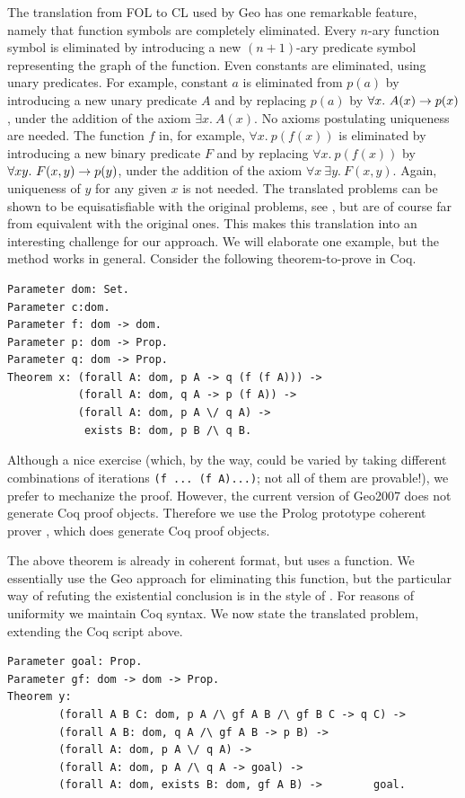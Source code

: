 \documentclass[a4paper,11pt]{article}
\begin{document}
The translation from  FOL to CL used by Geo has one
remarkable feature, namely that function symbols are completely
eliminated. Every $n$-ary function symbol is eliminated by introducing
a new $(n{+}1)$-ary predicate symbol representing the graph of the function.
Even constants are eliminated, using unary predicates.
For example, constant $a$ is eliminated from $p(a)$ by introducing
a new unary predicate $A$ and by replacing $p(a)$ by $\forall x.~A(x)\to p(x)$,
under the addition of the axiom $\exists x.~A(x)$. 
No axioms postulating uniqueness are needed. The function $f$ in,
for example, $\forall x.~p(f(x))$ is eliminated by introducing
a new binary predicate $F$ and by replacing $\forall x.~p(f(x))$
by $\forall xy.~F(x,y)\to p(y)$, under the addition of the axiom
$\forall x~\exists y.~F(x,y)$. Again, uniqueness of $y$ for
any given $x$ is not needed. The translated problems can be
shown to be equisatisfiable with the original problems,
see \cite{deNivelle2006a}, but are
of course far from equivalent with the original ones.
This makes this translation into an interesting challenge for
our approach. We will elaborate one example, but the method
works in general. Consider the following theorem-to-prove in Coq.
\begin{verbatim}
Parameter dom: Set.
Parameter c:dom.
Parameter f: dom -> dom.
Parameter p: dom -> Prop.
Parameter q: dom -> Prop.
Theorem x: (forall A: dom, p A -> q (f (f A))) ->
           (forall A: dom, q A -> p (f A)) ->
           (forall A: dom, p A \/ q A) ->
            exists B: dom, p B /\ q B.
\end{verbatim}
Although a nice exercise (which, by the way, could be varied by taking
different combinations of iterations \verb|(f ... (f A)...)|;
not all of them are provable!), we prefer to mechanize the proof.
However, the current version of Geo2007 does not generate Coq
proof objects. Therefore we use the Prolog prototype coherent prover 
\cite{Beze:Hend:05}, which does generate Coq proof objects.

The above theorem is already in coherent format, but uses a function.
We essentially use the Geo approach for eliminating this function,
but the particular way of refuting the existential conclusion is
in the style of \cite{Beze:Hend:05}.
For reasons of uniformity we maintain Coq syntax.
We now state the translated problem, extending the Coq script above.  
\begin{verbatim}
Parameter goal: Prop.
Parameter gf: dom -> dom -> Prop.
Theorem y: 
        (forall A B C: dom, p A /\ gf A B /\ gf B C -> q C) ->
        (forall A B: dom, q A /\ gf A B -> p B) ->
        (forall A: dom, p A \/ q A) ->
        (forall A: dom, p A /\ q A -> goal) ->
        (forall A: dom, exists B: dom, gf A B) ->        goal.
\end{verbatim}
\end{document}
